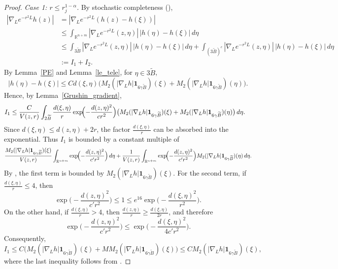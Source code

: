 \documentclass[12pt]{amsart}
\begin{document}
\begin{proof}
\textit{Case 1: $r\le r_j^{1-\alpha}$.} By stochastic completeness (\cite[Lemma]{RS}),
\begin{align}
    |\nabla_Le^{-r^2L}h(z)|
    &= |\nabla_Le^{-r^2L}( h(z) - h(\xi) )| \nonumber\\
    &\le \int_{\mathbb{R}^{n+m}} |\nabla_L e^{-r^2L}(z,\eta)| \, |h(\eta)-h(\xi)| \, d\eta\nonumber\\
    &\le \int_{3\widetilde{B}} |\nabla_L e^{-r^2L}(z,\eta)| \, |h(\eta)-h(\xi)| \, d\eta
      + \int_{(3\widetilde{B})^c} |\nabla_L e^{-r^2L}(z,\eta)| \, |h(\eta)-h(\xi)| \, d\eta \nonumber\\
    &:= I_1 + I_2.
\end{align}
By Lemma~\ref{PE} and Lemma~\ref{le_tele}, for $\eta \in 3\widetilde{B}$,
\begin{equation*}
    |h(\eta)-h(\xi)| \le C d(\xi,\eta)\bigl(M_2(|\nabla_L h|\mathbf{1}_{6\gamma \widetilde{B}})(\xi)+M_2(|\nabla_L h|\mathbf{1}_{6\gamma \widetilde{B}})(\eta)\bigr).
\end{equation*}
Hence, by Lemma~\ref{Grushin_gradient},
\begin{align*}
    I_1
    &\le \frac{C}{V(z,r)} \int_{2\widetilde{B}} \frac{d(\xi,\eta)}{r} \exp\!\Bigl( - \frac{d(z,\eta)^2}{c r^2} \Bigr) \bigl( M_2(|\nabla_L h|\mathbf{1}_{6\gamma \widetilde{B}})(\xi)+M_2(|\nabla_L h|\mathbf{1}_{6\gamma \widetilde{B}})(\eta) \bigr) \, d\eta.
\end{align*}
Since $d(\xi,\eta)\le d(z,\eta) + 2r$, the factor $\frac{d(\xi,\eta)}{r}$ can be absorbed into the exponential. Thus $I_1$ is bounded by a constant multiple of
\begin{align*}
    \frac{M_2(|\nabla_L h|\mathbf{1}_{6\gamma \widetilde{B}})(\xi)}{V(z,r)}
    \int_{\mathbb{R}^{n+m}} \exp\!\Bigl( - \frac{d(z,\eta)^2}{c' r^2} \Bigr) \, d\eta
    + \frac{1}{V(z,r)} \int_{\mathbb{R}^{n+m}}  \exp\!\Bigl( - \frac{d(z,\eta)^2}{c'r^2} \Bigr) M_2(|\nabla_L h|\mathbf{1}_{6\gamma \widetilde{B}})(\eta) \, d\eta.
\end{align*}
By \cite[Lemma~3.1]{CD}, the first term is bounded by $M_2(|\nabla_L h|\mathbf{1}_{6\gamma \widetilde{B}})(\xi)$. For the second term, if $\frac{d(\xi,\eta)}{r}\le 4$, then
\begin{equation*}
    \exp\!\biggl(-\frac{d(z,\eta)^2}{c'r^2} \biggr) \le 1 \le e^{16} \exp\!\biggl(-\frac{d(\xi,\eta)^2}{r^2} \biggr).
\end{equation*}
On the other hand, if $\frac{d(\xi,\eta)}{r} > 4$, then $\frac{d(z,\eta)}{r}\ge \frac{d(\xi,\eta)}{2r}$, and therefore
\begin{equation*}
    \exp\!\biggl(-\frac{d(z,\eta)^2}{c'r^2} \biggr) \le  \exp\!\biggl(-\frac{d(\xi,\eta)^2}{4c' r^2} \biggr).
\end{equation*}
Consequently,
\begin{equation}
    I_1 \le C \bigl(M_2(|\nabla_L h|\mathbf{1}_{6\gamma \widetilde{B}})(\xi) + M M_2( |\nabla_L h| \mathbf{1}_{6\gamma \widetilde{B}} )(\xi) \bigr)\le C M_2(|\nabla_L h|\mathbf{1}_{6\gamma \widetilde{B}})(\xi),
\end{equation}
where the last inequality follows from \cite{CR}.


\end{proof}
\end{document}
